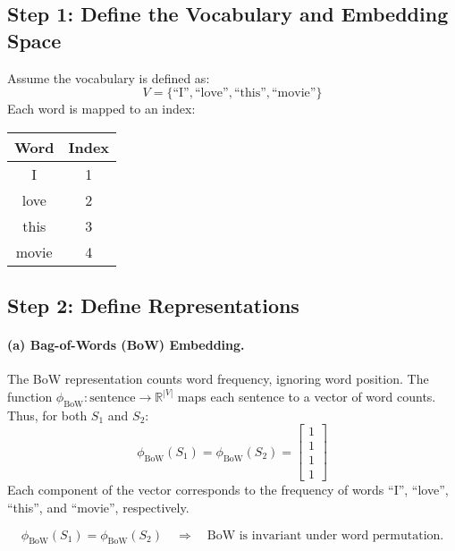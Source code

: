 \subsection*{Step 1: Define the Vocabulary and Embedding Space}

Assume the vocabulary is defined as:
\[
V = \{\text{``I''}, \text{``love''}, \text{``this''}, \text{``movie''}\}
\]
Each word is mapped to an index:

\begin{center}
	\begin{tabular}{|c|c|}
		\hline
		\textbf{Word} & \textbf{Index} \\
		\hline
		I & 1 \\
		love & 2 \\
		this & 3 \\
		movie & 4 \\
		\hline
	\end{tabular}
\end{center}

\subsection*{Step 2: Define Representations}

\paragraph{(a) Bag-of-Words (BoW) Embedding.}
The BoW representation counts word frequency, ignoring word position. The function $\phi_{\text{BoW}}: \text{sentence} \rightarrow \mathbb{R}^{|V|}$ maps each sentence to a vector of word counts. Thus, for both $S_1$ and $S_2$:
\[
\phi_{\text{BoW}}(S_1) = \phi_{\text{BoW}}(S_2) =
\begin{bmatrix}
	1 \\ 1 \\ 1 \\ 1
\end{bmatrix}
\]
Each component of the vector corresponds to the frequency of words ``I'', ``love'', ``this'', and ``movie'', respectively.

\begin{tcolorbox}[colback=gray!10, colframe=black, title=Conclusion]
	\[
	\phi_{\text{BoW}}(S_1) = \phi_{\text{BoW}}(S_2) \quad \Rightarrow \quad \text{BoW is invariant under word permutation.}
	\]
\end{tcolorbox}

